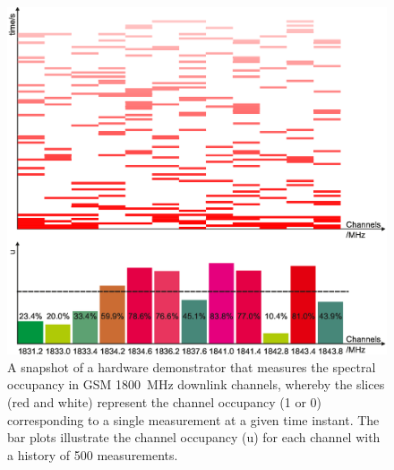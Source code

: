 \begin{figure}[!t]
\centering
\includegraphics[width = 0.9\columnwidth]{figures/Grafik_Poster}
\caption{A snapshot of a hardware demonstrator that measures the spectral occupancy in GSM \SI{1800}{MHz} downlink channels, whereby the slices (red and white) represent the channel occupancy (1 or 0) corresponding to a single measurement at a given time instant. The bar plots illustrate the channel occupancy (u) for each channel with a history of 500 measurements\protect{}.}
\label{fig_Int:HW_I}
\end{figure}


